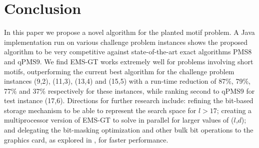 \documentclass[conference]{IEEEtran}
\begin{document}
\section{Conclusion}
	In this paper we propose a novel algorithm for the planted motif problem. A Java implementation run on various challenge problem instances shows the proposed algorithm to be very competitive against state-of-the-art exact algorithms PMS8 and qPMS9. We find EMS-GT works extremely well for problems involving short motifs, outperforming the current best algorithm for the challenge problem instances (9,2), (11,3), (13,4) and (15,5) with a run-time reduction of 87\%, 79\%, 77\% and 37\% respectively for these instances, 
	while ranking second to qPMS9 for test instance (17,6). Directions for further research include: refining the bit-based storage mechanism to be able to represent the search space for $l > 17$; creating a multiprocessor version of EMS-GT to solve in parallel for larger values of ($l$,$d$); and delegating the bit-masking optimization and other bulk bit operations to the graphics card, as explored in \cite{dasari2010efficient}, for faster performance.

\newpage


\end{document}
